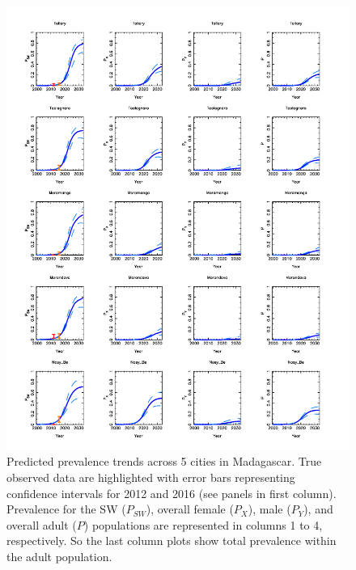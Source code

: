 \documentclass[preprint,12pt]{elsarticle}
\begin{document}
\begin{figure}
\includegraphics[width=\linewidth,angle=0]{Percentiles_Prevalence_10_Cities_B_Corrected.pdf}
\vspace{-1.0cm}
\caption{Predicted prevalence trends across 5 cities in Madagascar. True observed data are highlighted with error  bars representing confidence intervals for 2012 and 2016 (see panels in first column). Prevalence for the SW ($P_{SW}$), overall female ($P_X$), male ($P_Y$), and overall adult ($P$) populations are represented in columns 1 to 4, respectively. So the last column plots show total prevalence within the adult population.}
\label{Fig:Infected_Trends_Extrapolated}
\end{figure}
\end{document}
